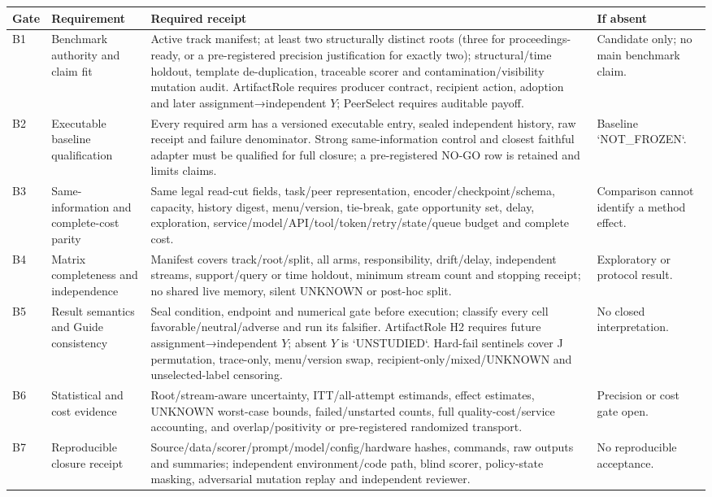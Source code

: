 \documentclass[10pt,a4paper]{article}
\begin{document}
\begin{center}\scriptsize\setlength{\tabcolsep}{2pt}\renewcommand{\arraystretch}{0.98}
\begin{tabularx}{\linewidth}{@{}lL{.22\linewidth}X L{.21\linewidth}@{}}\toprule
Gate & Requirement & Required receipt & If absent\\\midrule
B1 & Benchmark authority and claim fit & Active track manifest; at least two structurally distinct roots (three for proceedings-ready, or a pre-registered precision justification for exactly two); structural/time holdout, template de-duplication, traceable scorer and contamination/visibility mutation audit. ArtifactRole requires producer contract, recipient action, adoption and later assignment→independent $Y$; PeerSelect requires auditable payoff. & Candidate only; no main benchmark claim.\\
B2 & Executable baseline qualification & Every required arm has a versioned executable entry, sealed independent history, raw receipt and failure denominator. Strong same-information control and closest faithful adapter must be qualified for full closure; a pre-registered NO-GO row is retained and limits claims. & Baseline `NOT\_FROZEN`.\\
B3 & Same-information and complete-cost parity & Same legal read-cut fields, task/peer representation, encoder/checkpoint/schema, capacity, history digest, menu/version, tie-break, gate opportunity set, delay, exploration, service/model/API/tool/token/retry/state/queue budget and complete cost. & Comparison cannot identify a method effect.\\
B4 & Matrix completeness and independence & Manifest covers track/root/split, all arms, responsibility, drift/delay, independent streams, support/query or time holdout, minimum stream count and stopping receipt; no shared live memory, silent UNKNOWN or post-hoc split. & Exploratory or protocol result.\\
B5 & Result semantics and Guide consistency & Seal condition, endpoint and numerical gate before execution; classify every cell favorable/neutral/adverse and run its falsifier. ArtifactRole H2 requires future assignment→independent $Y$; absent $Y$ is `UNSTUDIED`. Hard-fail sentinels cover J permutation, trace-only, menu/version swap, recipient-only/mixed/UNKNOWN and unselected-label censoring. & No closed interpretation.\\
B6 & Statistical and cost evidence & Root/stream-aware uncertainty, ITT/all-attempt estimands, effect estimates, UNKNOWN worst-case bounds, failed/unstarted counts, full quality-cost/service accounting, and overlap/positivity or pre-registered randomized transport. & Precision or cost gate open.\\
B7 & Reproducible closure receipt & Source/data/scorer/prompt/model/config/hardware hashes, commands, raw outputs and summaries; independent environment/code path, blind scorer, policy-state masking, adversarial mutation replay and independent reviewer. & No reproducible acceptance.\\\bottomrule
\end{tabularx}\end{center}\normalsize
\end{document}

